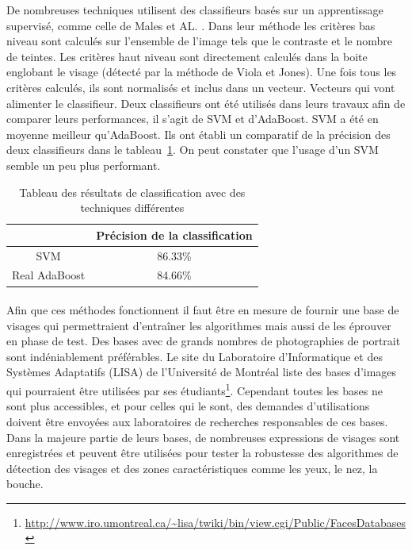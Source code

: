\documentclass[11pt, french]{report-rd-info}
\begin{document}
De nombreuses techniques utilisent des classifieurs basés sur un apprentissage supervisé, comme celle de Males et AL. \cite{Males2013}. Dans leur méthode les critères bas niveau sont calculés sur l’ensemble de l’image tels que le contraste et le nombre de teintes. Les critères haut niveau sont directement calculés dans la boite englobant le visage (détecté par la méthode de Viola et Jones). Une fois tous les critères calculés, ils sont normalisés et inclus dans un vecteur. Vecteurs qui vont alimenter le classifieur. Deux classifieurs ont été utilisés dans leurs travaux afin de comparer leurs performances, il s’agit de SVM et d’AdaBoost. SVM a été en moyenne meilleur qu’AdaBoost. Ils ont établi un comparatif de la précision des deux classifieurs dans le tableau~\ref{tab:ComparaisonSVMAdaBoost}. On peut constater que l'usage d'un SVM semble un peu plus performant.
\begin{table}
\begin{center}
\begin{tabular}{|c|c|}
\hline
& Précision de la classification \\
\hline
SVM & 86.33\% \\
\hline
Real AdaBoost & 84.66\% \\
\hline
\end{tabular}
\end{center}
\caption{Tableau des résultats de classification avec des techniques différentes \cite{Males2013}}
\label{tab:ComparaisonSVMAdaBoost}
\end{table}
\paragraph*{}
Afin que ces méthodes fonctionnent il faut être en mesure de fournir une base de visages qui permettraient d'entraîner les algorithmes mais aussi de les éprouver en phase de test.
Des bases avec de grands nombres de photographies de portrait sont indéniablement préférables. Le site du Laboratoire d'Informatique et des Systèmes Adaptatifs (LISA) de l'Université de Montréal liste des bases d'images qui pourraient être utilisées par ses étudiants\footnote{\url{http://www.iro.umontreal.ca/~lisa/twiki/bin/view.cgi/Public/FacesDatabases}}. Cependant toutes les bases ne sont plus accessibles, et pour celles qui le sont, des demandes d'utilisations doivent être envoyées aux laboratoires de recherches responsables de ces bases. Dans la majeure partie de leurs bases, de nombreuses expressions de visages sont enregistrées et peuvent être utilisées pour tester la robustesse des algorithmes de détection des visages et des zones caractéristiques comme les yeux, le nez, la bouche.
\end{document}
